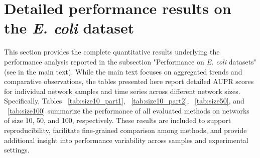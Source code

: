 \section{Detailed performance results on the \textit{E. coli}  dataset}\label{sec11}
This section provides the complete quantitative results underlying the performance analysis reported in the subsection "Performance on \textit{E. coli} datasets" (see in the main text). While the main text focuses on aggregated trends and comparative observations, the tables presented here report detailed AUPR scores for individual network samples and time series across different network sizes. Specifically, Tables ~\ref{tab:size10_part1}, ~\ref{tab:size10_part2}, ~\ref{tab:size50}, and ~\ref{tab:size100} summarize the performance of all evaluated methods on networks of size 10, 50, and 100, respectively. These results are included to support reproducibility, facilitate fine-grained comparison among methods, and provide additional insight into performance variability across samples and experimental settings.

